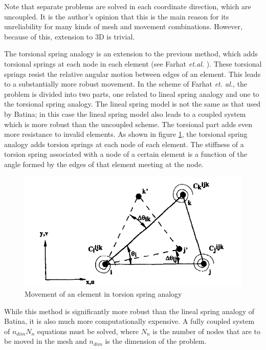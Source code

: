  Note that separate problems are solved in each coordinate direction, which are uncoupled. It is the author's opinion that this is the main reason for its unreliability for many kinds of mesh and movement combinations. However, because of this, extension to 3D is trivial.
 
 The torsional spring analogy is an extension to the previous method, which adds torsional springs at each node in each element (see Farhat \emph{et.al.} \cite{mm:torsionsprings}).
 These torsional springs resist the relative angular motion between edges of an element. This leads to a substantially more robust movement. In the scheme of Farhat \emph{et. al.}, the problem is divided into two parts, one related to lineal spring analogy and one to the torsional spring analogy. The lineal spring model is not the same as that used by Batina; in this case the lineal spring model also leads to a coupled system which is more robust than the uncoupled scheme. The torsional part adds even more resistance to invalid elements. As shown in figure \ref{f:torsion}, the torsional spring analogy adds torsion springs at each node of each element. The stiffness of a torsion spring associated with a node of a certain element is a function of the angle formed by the edges of that element meeting at the node.
 
 \begin{figure}
 	\centering
 	\includegraphics[scale=0.25]{torsionspring}
 	\caption{Movement of an element in torsion spring analogy}
 	\label{f:torsion}
 \end{figure}
 
 While this method is significantly more robust than the lineal spring analogy of Batina, it is also much more computationally expensive. A fully coupled system of $n_{dim} N_n$ equations must be solved, where $N_n$ is the number of nodes that are to be moved in the mesh and $n_{dim}$ is the dimension of the problem.
 
